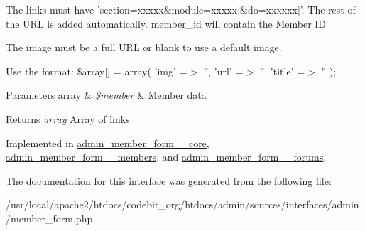 The links must have 'section=xxxxx\&module=xxxxx\mbox{[}\&do=xxxxxx\mbox{]}'. The rest of the U\-R\-L is added automatically. member\-\_\-id will contain the Member I\-D

The image must be a full U\-R\-L or blank to use a default image.

Use the format\-: \$array\mbox{[}\mbox{]} = array( 'img' =$>$ '', 'url' =$>$ '', 'title' =$>$ '' );


\begin{DoxyParams}[1]{Parameters}
array & {\em \$member} & Member data \\
\hline
\end{DoxyParams}
\begin{DoxyReturn}{Returns}
{\itshape array} Array of links 
\end{DoxyReturn}


Implemented in \hyperlink{classadmin__member__form____core_aa06c25b69a518bbb6eaaaf6a84047f04}{admin\-\_\-member\-\_\-form\-\_\-\-\_\-core}, \hyperlink{classadmin__member__form____members_aa06c25b69a518bbb6eaaaf6a84047f04}{admin\-\_\-member\-\_\-form\-\_\-\-\_\-members}, and \hyperlink{classadmin__member__form____forums_aa06c25b69a518bbb6eaaaf6a84047f04}{admin\-\_\-member\-\_\-form\-\_\-\-\_\-forums}.



The documentation for this interface was generated from the following file\-:\begin{DoxyCompactItemize}
\item 
/usr/local/apache2/htdocs/codebit\-\_\-org/htdocs/admin/sources/interfaces/admin/member\-\_\-form.\-php\end{DoxyCompactItemize}

